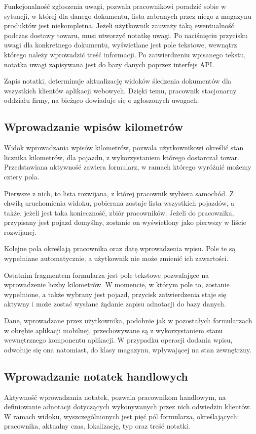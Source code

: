 Funkcjonalność zgłoszenia uwagi, pozwala pracownikowi poradzić sobie w sytuacji, w której dla danego dokumentu, lista zabranych przez niego z magazynu produktów jest niekompletna. Jeżeli użytkownik zauważy taką ewentualność podczas dostawy towaru, musi utworzyć notatkę uwagi. Po naciśnięciu przycisku uwagi dla konkretnego dokumentu, wyświetlane jest pole tekstowe, wewnątrz którego należy wprowadzić treść informacji. Po zatwierdzeniu wpisanego tekstu, notatka uwagi zapisywana jest do bazy danych poprzez interfejs API.

Zapis notatki, determinuje aktualizację widoków śledzenia dokumentów dla wszystkich klientów aplikacji webowych. Dzięki temu, pracownik stacjonarny oddziału firmy, na bieżąco dowiaduje się o zgłoszonych uwagach.  

\subsection{Wprowadzanie wpisów kilometrów}
\label{subsec:mobilna-kilometry}
Widok wprowadzania wpisów kilometrów, pozwala użytkownikowi określić stan licznika kilometrów, dla pojazdu, z wykorzystaniem którego dostarczał towar. Przedstawiana aktywność zawiera formularz, w ramach którego wyróżnić możemy cztery pola.

Pierwsze z nich, to lista rozwijana, z której pracownik wybiera samochód. Z chwilą uruchomienia widoku, pobierana zostaje lista wszystkich pojazdów, a także, jeżeli jest taka konieczność, zbiór pracowników. Jeżeli do pracownika, przypisany jest pojazd domyślny, zostanie on wyświetlony jako pierwszy w liście rozwijanej.

Kolejne pola określają pracownika oraz datę wprowadzenia wpisu. Pole te są wypełniane automatycznie, a użytkownik nie może zmienić ich zawartości.

Ostatnim fragmentem formularza jest pole tekstowe pozwalające na wprowadzenie liczby kilometrów. W momencie, w którym pole to, zostanie wypełnione, a także wybrany jest pojazd, przycisk zatwierdzenia staje się aktywny i może zostać wysłane żądanie zapisu adnotacji do bazy danych.

Dane, wprowadzane przez użytkownika, podobnie jak w pozostałych formularzach w obrębie aplikacji mobilnej, przechowywane są z wykorzystaniem stanu wewnętrznego komponentu aplikacji. W przypadku operacji dodania wpisu, odwołuje się ona natomiast, do klasy magazynu, wpływającej na stan zewnętrzny.

\subsection{Wprowadzanie notatek handlowych}
Aktywność wprowadzania notatek, pozwala pracownikom handlowym, na definiowanie adnotacji dotyczących wykonywanych przez nich odwiedzin klientów. W ramach widoku, wyszczególnionych jest pięć pól formularza, określających: pracownika, aktualny czas, lokalizację, typ oraz treść notatki.

